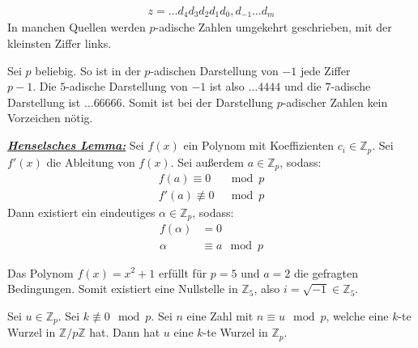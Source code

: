 \documentclass[9pt]{article}
\newcommand{\tbf}[1]{\textbf{#1}}
\newcommand{\ul}[1]{\underline{#1}}
\newcommand{\theoremname}[1]{\emph{\tbf{\ul{#1}}}}
\newcommand{\bZ}{\mathbb{Z}}
\begin{document}
	\begin{align*}
		z = \hdots d_4 d_3 d_2 d_1 d_0, d_{-1} \hdots d_{m}
	\end{align*}
	In manchen Quellen werden $p$-adische Zahlen umgekehrt geschrieben, mit der kleinsten Ziffer links.
	\begin{proposition}
		Sei $p$ beliebig. So ist in der $p$-adischen Darstellung von $-1$ jede Ziffer\\ $p-1$. Die $5$-adische Darstellung von $-1$ ist also $\hdots4444$ und die $7$-adische Darstellung ist $\hdots66666$. Somit ist bei der Darstellung $p$-adischer Zahlen kein Vorzeichen nötig.
	\end{proposition}
	\setcounter{hahaone}{3}
	\begin{theorem}
		\theoremname{Henselsches Lemma:}
		Sei $f(x)$ ein Polynom mit Koeffizienten $c_i \in \bZ_p$. Sei $f'(x)$ die Ableitung von $f(x)$.
		Sei außerdem $a \in \bZ_p$, sodass:
		\begin{align*}
			f(a) \equiv 0 &\mod p\\
			f'(a) \not\equiv 0 &\mod p
		\end{align*}
		Dann existiert ein eindeutiges $\alpha \in \bZ_p$, sodass:
		\begin{align*}
				f(\alpha) &= 0\\
				\alpha &\equiv a \mod p
		\end{align*}
	\end{theorem}
	\begin{application}
		Das Polynom $f(x) = x^2 + 1$ erfüllt für $p = 5$ und $a = 2$ die gefragten Bedingungen. Somit existiert eine Nullstelle in $\bZ_5$, also $i = \sqrt{-1} \in \bZ_5$.
	\end{application}
	\begin{application}
		Sei $u \in \bZ_p$. Sei $k \not \equiv 0 \mod p$. Sei $n$ eine Zahl mit $n \equiv u \mod p$, welche eine $k$-te Wurzel in $\bZ / p\bZ$ hat. Dann hat $u$ eine $k$-te Wurzel in $\bZ_p$.
	\end{application}
\end{document}
